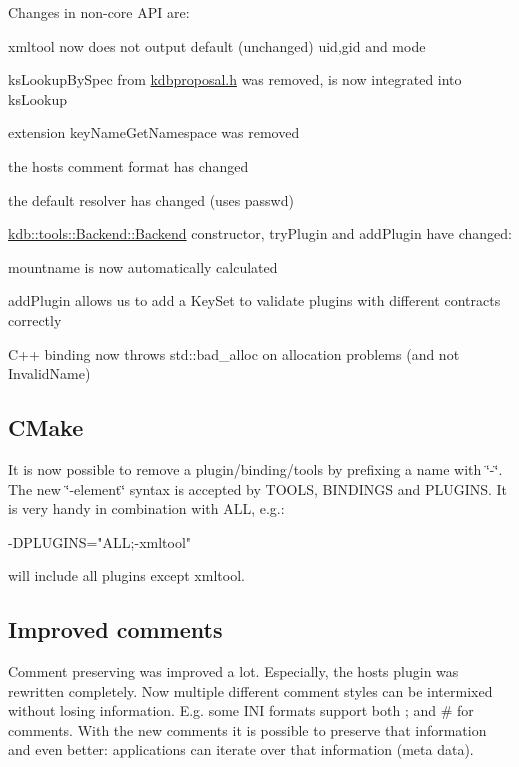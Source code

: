 Changes in non-\/core A\+P\+I are\+:


\begin{DoxyItemize}
\item xmltool now does not output default (unchanged) uid,gid and mode
\item ks\+Lookup\+By\+Spec from \hyperlink{kdbproposal_8h}{kdbproposal.\+h} was removed, is now integrated into ks\+Lookup
\item extension key\+Name\+Get\+Namespace was removed
\item the hosts comment format has changed
\item the default resolver has changed (uses passwd)
\item \hyperlink{classkdb_1_1tools_1_1Backend_a1650b149ebf313ee8cd3472247212263}{kdb\+::tools\+::\+Backend\+::\+Backend} constructor, try\+Plugin and add\+Plugin have changed\+:
\begin{DoxyItemize}
\item mountname is now automatically calculated
\item add\+Plugin allows us to add a Key\+Set to validate plugins with different contracts correctly
\end{DoxyItemize}
\item C++ binding now throws std\+::bad\+\_\+alloc on allocation problems (and not Invalid\+Name)
\end{DoxyItemize}

\subsection*{C\+Make}

It is now possible to remove a plugin/binding/tools by prefixing a name with \char`\"{}-\/\char`\"{}. The new \char`\"{}-\/element\char`\"{} syntax is accepted by T\+O\+O\+L\+S, B\+I\+N\+D\+I\+N\+G\+S and P\+L\+U\+G\+I\+N\+S. It is very handy in combination with A\+L\+L, e.\+g.\+: \begin{DoxyVerb}-DPLUGINS="ALL;-xmltool"
\end{DoxyVerb}


will include all plugins except xmltool.

\subsection*{Improved comments}

Comment preserving was improved a lot. Especially, the hosts plugin was rewritten completely. Now multiple different comment styles can be intermixed without losing information. E.\+g. some I\+N\+I formats support both ; and \# for comments. With the new comments it is possible to preserve that information and even better\+: applications can iterate over that information (meta data).

